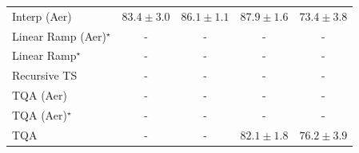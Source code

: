 \begin{tabular}{l|cccc|}
Interp (Aer) & {\cellcolor[HTML]{E46710}} \color[HTML]{F1F1F1} $83.4\pm 3.0$ & {\cellcolor[HTML]{C44802}} \color[HTML]{F1F1F1} $86.1\pm 1.1$ & {\cellcolor[HTML]{A63A03}} \color[HTML]{F1F1F1} $87.9\pm 1.6$ & {\cellcolor[HTML]{FEE799}} \color[HTML]{000000} $73.4\pm 3.8$ \\
Linear Ramp (Aer)$^\star$ & {\cellcolor[HTML]{000000}} \color[HTML]{F1F1F1} {\cellcolor{white}} \color{black} - & {\cellcolor[HTML]{000000}} \color[HTML]{F1F1F1} {\cellcolor{white}} \color{black} - & {\cellcolor[HTML]{000000}} \color[HTML]{F1F1F1} {\cellcolor{white}} \color{black} - & {\cellcolor[HTML]{000000}} \color[HTML]{F1F1F1} {\cellcolor{white}} \color{black} - \\
Linear Ramp$^\star$ & {\cellcolor[HTML]{000000}} \color[HTML]{F1F1F1} {\cellcolor{white}} \color{black} - & {\cellcolor[HTML]{000000}} \color[HTML]{F1F1F1} {\cellcolor{white}} \color{black} - & {\cellcolor[HTML]{000000}} \color[HTML]{F1F1F1} {\cellcolor{white}} \color{black} - & {\cellcolor[HTML]{000000}} \color[HTML]{F1F1F1} {\cellcolor{white}} \color{black} - \\
Recursive TS & {\cellcolor[HTML]{000000}} \color[HTML]{F1F1F1} {\cellcolor{white}} \color{black} - & {\cellcolor[HTML]{000000}} \color[HTML]{F1F1F1} {\cellcolor{white}} \color{black} - & {\cellcolor[HTML]{000000}} \color[HTML]{F1F1F1} {\cellcolor{white}} \color{black} - & {\cellcolor[HTML]{000000}} \color[HTML]{F1F1F1} {\cellcolor{white}} \color{black} - \\
TQA (Aer) & {\cellcolor[HTML]{000000}} \color[HTML]{F1F1F1} {\cellcolor{white}} \color{black} - & {\cellcolor[HTML]{000000}} \color[HTML]{F1F1F1} {\cellcolor{white}} \color{black} - & {\cellcolor[HTML]{000000}} \color[HTML]{F1F1F1} {\cellcolor{white}} \color{black} - & {\cellcolor[HTML]{000000}} \color[HTML]{F1F1F1} {\cellcolor{white}} \color{black} - \\
TQA (Aer)$^\star$ & {\cellcolor[HTML]{000000}} \color[HTML]{F1F1F1} {\cellcolor{white}} \color{black} - & {\cellcolor[HTML]{000000}} \color[HTML]{F1F1F1} {\cellcolor{white}} \color{black} - & {\cellcolor[HTML]{000000}} \color[HTML]{F1F1F1} {\cellcolor{white}} \color{black} - & {\cellcolor[HTML]{000000}} \color[HTML]{F1F1F1} {\cellcolor{white}} \color{black} - \\
TQA & {\cellcolor[HTML]{000000}} \color[HTML]{F1F1F1} {\cellcolor{white}} \color{black} - & {\cellcolor[HTML]{000000}} \color[HTML]{F1F1F1} {\cellcolor{white}} \color{black} - & {\cellcolor[HTML]{F07919}} \color[HTML]{F1F1F1} $82.1\pm 1.8$ & {\cellcolor[HTML]{FECB5F}} \color[HTML]{000000} $76.2\pm 3.9$ \\

\end{tabular}
